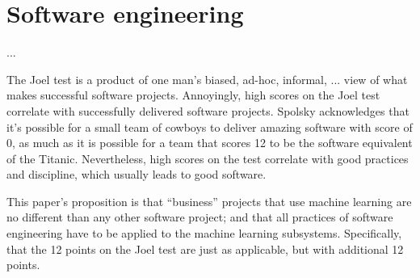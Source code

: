 \section{Software engineering}
...

The Joel test\cite{joeltest} is a product of one man's biased, ad-hoc, informal, ... view of what makes successful software projects. Annoyingly, high scores on the Joel test correlate with successfully delivered software projects. Spolsky acknowledges that it's possible for a small team of cowboys to deliver amazing software with score of 0, as much as it is possible for a team that scores 12 to be the software equivalent of the Titanic. Nevertheless, high scores on the test correlate with good practices and discipline, which usually leads to good software.

This paper's proposition is that ``business'' projects that use machine learning are no different than any other software project; and that all practices of software engineering have to be applied to the machine learning subsystems. Specifically, that the 12 points on the Joel test are just as applicable, but with additional 12 points. 

